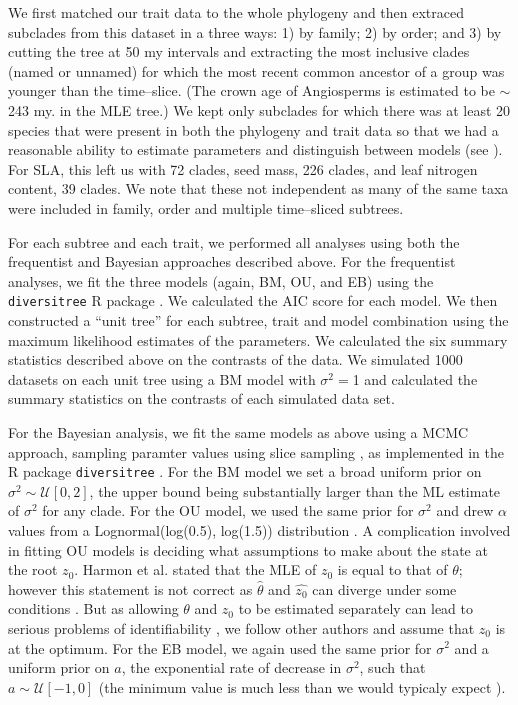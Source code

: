 \documentclass[a4paper,12pt]{article}
\begin{document}
We first matched our trait data to the whole phylogeny and then extraced subclades from this dataset in a three ways: 1) by family; 2) by order; and 3) by cutting the tree at 50 my intervals and extracting the most inclusive clades (named or unnamed) for which the most recent common ancestor of a group was younger than the time--slice. 
(The crown age of Angiosperms is estimated to be $\sim$243 my. in the MLE tree.) We kept only subclades for which there was at least 20 species that were present in both the phylogeny and trait data so that we had a reasonable ability to estimate parameters and distinguish between models (see \citep{Boettiger2012, SlaterPennell}). 
For SLA, this left us with 72 clades, seed mass, 226 clades, and leaf nitrogen content, 39 clades. We note that these not independent as many of the same taxa were included in family, order and multiple time--sliced subtrees. 

For each subtree and each trait, we performed all analyses using both the frequentist and Bayesian approaches described above. For the frequentist analyses, we fit the three models (again, BM, OU, and EB) using the \texttt{diversitree} R package \citep{FitzJohn2012}. We calculated the AIC \citep{Akaike1974} score for each model. We then constructed a ``unit tree'' for each subtree, trait and model combination using the maximum likelihood estimates of the parameters. We calculated the six summary statistics described above on the contrasts of the data. We simulated 1000 datasets on each unit tree using a BM model with $\sigma^2=$1 and calculated the summary statistics on the contrasts of each simulated data set. 

For the Bayesian analysis, we fit the same models as above using a MCMC approach, sampling paramter values using slice sampling \citep{Nealslice}, as implemented in the R package \texttt{diversitree} \citep{FitzJohn2012}. For the BM model we set a broad uniform prior on $\sigma^2 \sim \mathcal{U}[0, 2]$, the upper bound being substantially larger than the ML estimate of $\sigma^2$ for any clade. For the OU model, we used the same prior for $\sigma^2$ and drew $\alpha$ values from a Lognormal(log(0.5), log(1.5)) distribution \citep{UyedaBayou}. A complication involved in fitting OU models is deciding what assumptions to make about the state at the root $z_0$. Harmon et al. \citep{Harmon2010} stated that the MLE of $z_0$ is equal to that of $\theta$; however this statement is not correct as $\hat{\theta}$ and $\hat{z_0}$ can diverge under some conditions \citep{HoAne2012}. But as allowing $\theta$ and $z_0$ to be estimated separately can lead to serious problems of identifiability \citep{HoAne2012}, we follow other authors \citep{ButlerKing2004, Beaulieu2012} and assume that $z_0$ is at the optimum. For the EB model, we again used the same prior for $\sigma^2$ and a uniform prior on $a$, the exponential rate of decrease in $\sigma^2$, such that $a \sim \mathcal{U}[-1, 0]$ (the minimum value is much less than we would typicaly expect \citep{SlaterPennell}).
\end{document}
